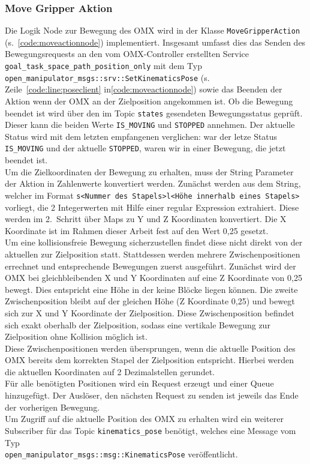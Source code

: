 \subsubsection{Move Gripper Aktion}
Die Logik Node zur Bewegung des OMX wird in der Klasse \verb|MoveGripperAction| (s.~\ref{code:moveactionnode}) implementiert.
Insgesamt umfasst dies das Senden des Bewegungsrequests an den vom OMX-Controller erstellten Service \verb|goal_task_space_path_position_only| mit dem Typ \verb|open_manipulator_msgs::srv::SetKinematicsPose| (s. Zeile~\ref{code:line:poseclient} in\ref{code:moveactionnode}) sowie das Beenden der Aktion wenn der OMX an der Zielposition angekommen ist.
Ob die Bewegung beendet ist wird über den im Topic \verb|states| gesendeten Bewegungsstatus geprüft.
Dieser kann die beiden Werte \verb|IS_MOVING| und \verb|STOPPED| annehmen.
Der aktuelle Status wird mit dem letzten empfangenen verglichen: war der letze Status \verb|IS_MOVING| und der aktuelle \verb|STOPPED|, waren wir in einer Bewegung, die jetzt beendet ist.\\
Um die Zielkoordinaten der Bewegung zu erhalten, muss der String Parameter der Aktion in Zahlenwerte konvertiert werden.
Zunächst werden aus dem String, welcher im Format \verb|s<Nummer des Stapels>l<Höhe innerhalb eines Stapels>| vorliegt, die 2 Integerwerten mit Hilfe einer regular Expression extrahiert.
Diese werden im 2.\ Schritt über Maps zu Y und Z Koordinaten konvertiert.
Die X Koordinate ist im Rahmen dieser Arbeit fest auf den Wert 0,25 gesetzt.\\
Um eine kollisionsfreie Bewegung sicherzustellen findet diese nicht direkt von der aktuellen zur Zielposition statt.
Stattdessen werden mehrere Zwischenpositionen errechnet und entsprechende Bewegungen zuerst ausgeführt.
Zunächst wird der OMX bei gleichbleibenden X und Y Koordinaten auf eine Z Koordinate von 0,25 bewegt.
Dies entspricht eine Höhe in der keine Blöcke liegen können.
Die zweite Zwischenposition bleibt auf der gleichen Höhe (Z Koordinate 0,25) und bewegt sich zur X und Y Koordinate der Zielposition.
Diese Zwischenposition befindet sich exakt oberhalb der Zielposition, sodass eine vertikale Bewegung zur Zielposition ohne Kollision möglich ist.\\
Diese Zwischenpositionen werden übersprungen, wenn die aktuelle Position des OMX bereits dem korrekten Stapel der Zielposition entspricht.
Hierbei werden die aktuellen Koordinaten auf 2 Dezimalstellen gerundet.\\
Für alle benötigten Positionen wird ein Request erzeugt und einer Queue hinzugefügt.
Der Auslöser, den nächsten Request zu senden ist jeweils das Ende der vorherigen Bewegung.\\
Um Zugriff auf die aktuelle Position des OMX zu erhalten wird ein weiterer Subscriber für das Topic \verb|kinematics_pose| benötigt, welches eine Message vom Typ\\
\verb|open_manipulator_msgs::msg::KinematicsPose| veröffentlicht.

